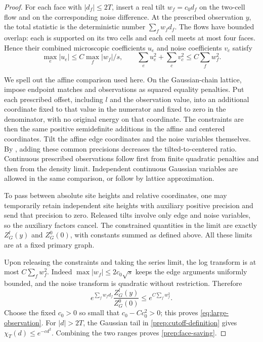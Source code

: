 \begin{proof}
For each face with $|d_f|\le2T$, insert a real tilt
$w_f=c_0d_f$ on the two-cell flow and on the corresponding noise
difference.  At the prescribed observation $y$, the total statistic is
the deterministic number $\sum_fw_fd_f$.  The flows have bounded overlap:
each is supported on its two cells and each cell meets at most four
faces.  Hence their combined microscopic coefficients $u_e$ and noise
coefficients $v_c$ satisfy
\[
 \max_e|u_e|\le C\max_f|w_f|/s,
 \qquad \sum_eu_e^2+\sum_cv_c^2\le C\sum_fw_f^2.
\]

We spell out the affine comparison used here.  On the Gaussian-chain
lattice, impose endpoint matches and observations as squared equality
penalties.  Put each prescribed offset, including $l$ and the observation
value, into an additional coordinate fixed to that value in the
numerator and fixed to zero in the denominator, with no original energy
on that coordinate.  The constraints are then the same positive
semidefinite additions in the affine and centered coordinates.  Tilt the
affine edge coordinates and the noise variables themselves.
By \cite[Lemma 2.2(ii)]{X}, adding these common
precisions decreases the tilted-to-centered ratio.  Continuous prescribed
observations follow first from finite quadratic penalties and then from
the density limit.  Independent continuous Gaussian variables are
allowed in the same comparison, or follow by lattice approximation.

To pass between absolute site heights and relative coordinates, one may
temporarily retain independent site heights with auxiliary positive
precision and send that precision to zero.  Released tilts involve only
edge and noise variables, so the auxiliary factors cancel.  The
constrained quantities in the limit are exactly $Z_G^l(y)$ and $Z_G^0(0)$,
with constants summed as defined above.  All these limits are at a fixed
primary graph.

Upon releasing the constraints and taking the series limit, the log
transform is at most $C\sum_fw_f^2$.  Indeed
$\max|w_f|\le2c_0\sqrt{s}$ keeps the edge arguments uniformly bounded,
and the noise transform is quadratic without restriction.  Therefore
\[
 e^{\sum_fw_fd_f}\frac{Z_G^l(y)}{Z_G^0(0)}
                       \le e^{C\sum_fw_f^2}.
\]
Choose the fixed $c_0>0$ so small that $c_0-Cc_0^2>0$; this proves
\eqref{eq:large-observation}.  For $|d|>2T$, the Gaussian tail in
\eqref{prep:cutoff-definition} gives $\chi_T(d)\le e^{-c d^2}$.
Combining the two ranges proves \eqref{prep:face-saving}.
\end{proof}

